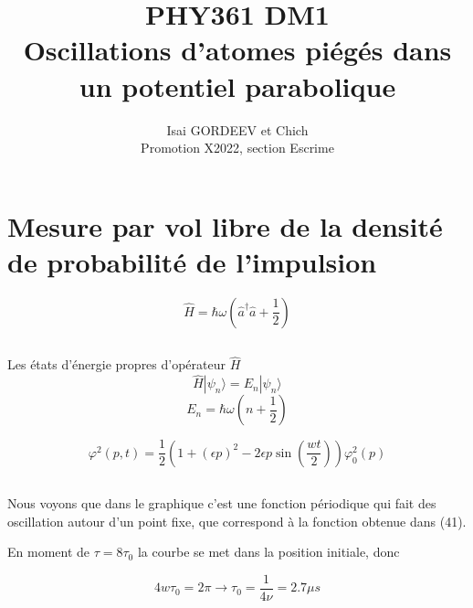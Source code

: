 \documentclass[a4paper,12pt]{article}
\title{PHY361 DM1 \\
 Oscillations d’atomes piégés dans un potentiel parabolique}
\author{Isai GORDEEV et Chich\\
Promotion X2022, section Escrime}
\begin{document}
\maketitle



\section{Mesure par vol libre de la densité de probabilité de l’impulsion}
$$\hat H =  \hbar\omega(\hat a^{\dagger }\hat a + \frac12)$$
\subsection{}
Les états d'énergie propres d'opérateur $\hat H$
\begin{equation}\label{key}
	\hat H |\psi_n\rangle = E_n |\psi_n\rangle
\end{equation}
$$E_n = \hbar\omega(n+\frac 1 2) $$






\begin{equation}
	\varphi^2(p, t) =\frac{1}{2}\left(1+(\epsilon p)^2 - 2\epsilon p \sin\left(\frac {wt} 2\right)\right) \varphi^2_0(p)
\end{equation}

\subsection{}

Nous voyons que dans le graphique c'est une fonction périodique qui fait des oscillation autour d'un point fixe, que correspond à la fonction obtenue dans (41). 

En moment de $\tau = 8\tau_0$ la courbe se met dans la position initiale, donc 

\begin{equation}\label{key}
	4w\tau_0 = 2\pi \rightarrow \tau_0 = \frac {1} {4\nu} = 2.7\mu s
\end{equation}
\end{document}
